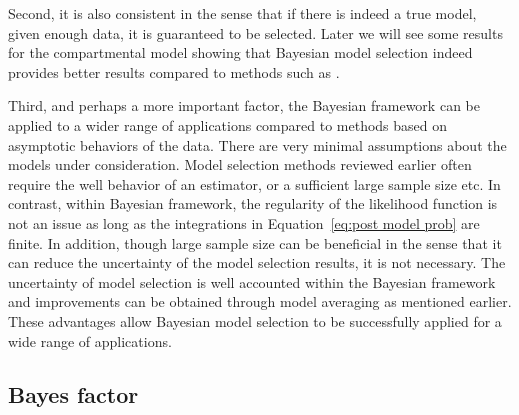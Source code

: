 Second, it is also consistent in the sense that if there is indeed a true model, given enough data, it is guaranteed to be selected. Later we will see some results for the \pet compartmental model showing that Bayesian model selection indeed provides better results compared to methods such as \aic.

Third, and perhaps a more important factor, the Bayesian framework can be applied to a wider range of applications compared to methods based on asymptotic behaviors of the data. There are very minimal assumptions about the models under consideration. Model selection methods reviewed earlier often require the well behavior of an estimator, or a sufficient large sample size etc. In contrast, within Bayesian framework, the regularity of the likelihood function is not an issue as long as the integrations in Equation~\eqref{eq:post model prob} are finite. In addition, though large sample size can be beneficial in the sense that it can reduce the uncertainty of the model selection results, it is not necessary. The uncertainty of model selection is well accounted within the Bayesian framework and improvements can be obtained through model averaging as mentioned earlier. These advantages allow Bayesian model selection to be successfully applied for a wide range of applications.

\subsection{Bayes factor}
\label{sub:Bayes factor}


